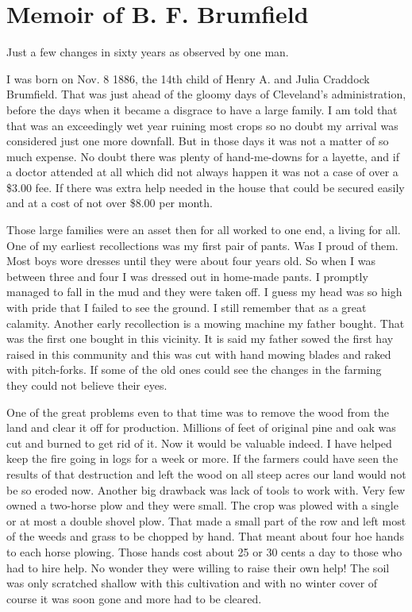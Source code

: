 
\chapter{Memoir of B. F. Brumfield}

Just a few changes in sixty years as observed by one man. 

I was born on Nov. 8 1886, the 14th child of Henry A. and Julia Craddock Brumfield. That was just ahead of the gloomy days of Cleveland's administration, before the days when it became a disgrace to have a large family. I am told that that was an exceedingly wet year ruining most crops so no doubt my arrival was considered just one more downfall. But in those days it was not a matter of so much expense. No doubt there was plenty of hand-me-downs for a layette, and if a doctor attended at all which did not always happen it was not a case of over a \$3.00 fee. If there was extra help needed in the house that could be secured easily and at a cost of not over \$8.00 per month.  

Those large families were an asset then for all worked to one end, a living for all. One of my earliest recollections was my first pair of pants. Was I proud of them. Most boys wore dresses until they were about four years old. So when I was between three and four I was dressed out in home-made pants. I promptly managed to fall in the mud and they were taken off. I guess my head was so high with pride that I failed to see the ground. I still remember that as a great calamity. Another early recollection is a mowing machine my father bought. That was the first one bought in this vicinity. It is said my father sowed the first hay raised in this community and this was cut with hand mowing blades and raked with pitch-forks. If some of the old ones could see the changes in the farming they could not believe their eyes. 

One of the great problems even to that time was to remove the wood from the land and clear it off for production. Millions of feet of original pine and oak was cut and burned to get rid of it. Now it would be valuable indeed. I have helped keep the fire going in logs for a week or more. If the farmers could have seen the results of that destruction and left the wood on all steep acres our land would not be so eroded now. Another big drawback was lack of tools to work with. Very few owned a two-horse plow and they were small. The crop was plowed with a  single or at most a double shovel plow. That made a small part of the row and left most of the weeds and grass to be chopped by hand. That meant about four hoe hands to each horse plowing. Those hands cost about 25 or 30 cents a day to those who had to hire help. No wonder they were willing to raise their own help! The soil was  only scratched shallow  with this cultivation  and with no winter cover of course it was soon gone and more had to be cleared.

